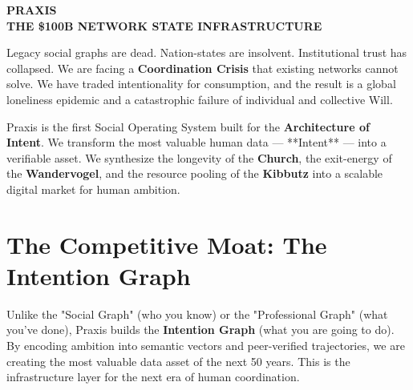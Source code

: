 \documentclass[11pt,a4paper]{article}
\begin{document}
\pagecolor{praxisDark}
\color{praxisText}

\begin{center}
\vspace*{1cm}
{\fontsize{60}{70}\selectfont\textbf{\textcolor{praxisBlue}{P}RAXIS}}\\[0.5cm]
{\LARGE\textbf{THE \$100B NETWORK STATE INFRASTRUCTURE}}\\[1.5cm]
\end{center}

\begin{pitchbox}
Legacy social graphs are dead. Nation-states are insolvent. Institutional trust has collapsed. We are facing a \textbf{Coordination Crisis} that existing networks cannot solve. We have traded intentionality for consumption, and the result is a global loneliness epidemic and a catastrophic failure of individual and collective Will.
\end{pitchbox}

\begin{pitchbox}
Praxis is the first Social Operating System built for the \textbf{Architecture of Intent}. We transform the most valuable human data — **Intent** — into a verifiable asset. We synthesize the longevity of the \textbf{Church}, the exit-energy of the \textbf{Wandervogel}, and the resource pooling of the \textbf{Kibbutz} into a scalable digital market for human ambition.
\end{pitchbox}

\begin{center}
\end{center}

\section*{The Competitive Moat: The Intention Graph}
Unlike the "Social Graph" (who you know) or the "Professional Graph" (what you've done), Praxis builds the \textbf{Intention Graph} (what you are going to do). By encoding ambition into semantic vectors and peer-verified trajectories, we are creating the most valuable data asset of the next 50 years. This is the infrastructure layer for the next era of human coordination.
\end{document}
